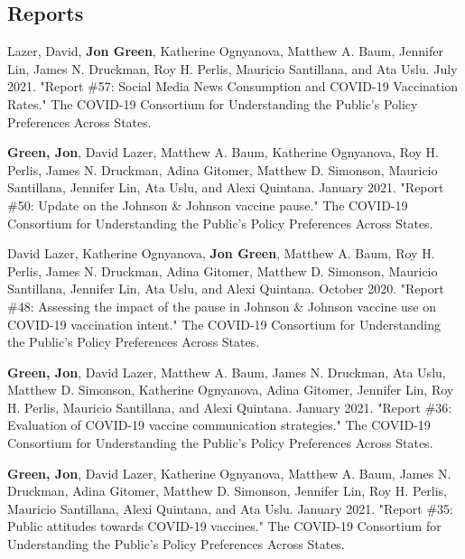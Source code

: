 \documentclass[letterpaper]{article}
\renewenvironment{itemize}{
  \begin{list}{}{
    \setlength{\leftmargin}{1.5em}
  }
}{
  \end{list}
}
\begin{document}
\subsection*{Reports}

\begin{itemize}

\item  Lazer, David, \textbf{Jon Green},  Katherine Ognyanova, Matthew A. Baum, Jennifer Lin, James N. Druckman, Roy H. Perlis, Mauricio Santillana, and Ata Uslu. July 2021. "Report \#57: Social Media News Consumption and COVID-19 Vaccination Rates." The COVID-19 Consortium for Understanding the Public’s Policy Preferences Across States.

\item  \textbf{Green, Jon}, David Lazer, Matthew A. Baum, Katherine Ognyanova, Roy H. Perlis, James N. Druckman, Adina Gitomer, Matthew D. Simonson, Mauricio Santillana, Jennifer Lin, Ata Uslu, and Alexi Quintana. January 2021. "Report \#50: Update on the Johnson \& Johnson vaccine pause." The COVID-19 Consortium for Understanding the Public’s Policy Preferences Across States.

\item David Lazer, Katherine Ognyanova, \textbf{Jon Green}, Matthew A. Baum, Roy H. Perlis, James N. Druckman, Adina Gitomer, Matthew D. Simonson, Mauricio Santillana, Jennifer Lin, Ata Uslu, and Alexi Quintana. October 2020. "Report \#48: Assessing the impact of the pause in Johnson \& Johnson vaccine use on COVID-19 vaccination intent." The COVID-19 Consortium for Understanding the Public’s Policy Preferences Across States.

\item  \textbf{Green, Jon}, David Lazer, Matthew A. Baum, James N. Druckman, Ata Uslu, Matthew D. Simonson, Katherine Ognyanova, Adina Gitomer, Jennifer Lin, Roy H. Perlis, Mauricio Santillana, and Alexi Quintana. January 2021. "Report \#36: Evaluation of COVID-19 vaccine communication strategies." The COVID-19 Consortium for Understanding the Public’s Policy Preferences Across States.

\item  \textbf{Green, Jon}, David Lazer, Katherine Ognyanova, Matthew A. Baum, James N. Druckman, Adina Gitomer, Matthew D. Simonson, Jennifer Lin, Roy H. Perlis, Mauricio Santillana, Alexi Quintana, and Ata Uslu. January 2021. "Report \#35: Public attitudes towards COVID-19 vaccines." The COVID-19 Consortium for Understanding the Public’s Policy Preferences Across States.


\end{itemize}
\end{document}
